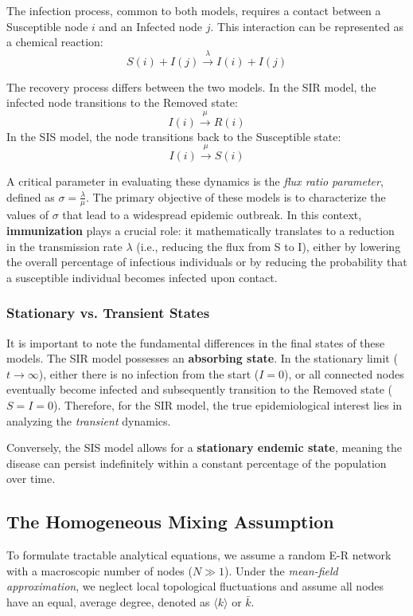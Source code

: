 The infection process, common to both models, requires a contact between a Susceptible node \(i\) and an Infected node \(j\). This interaction can be represented as a chemical reaction:
\[
    S(i) + I(j) \xrightarrow{\lambda} I(i) + I(j)
\]

The recovery process differs between the two models. In the SIR model, the infected node transitions to the Removed state:
\[
    I(i) \xrightarrow{\mu} R(i)
\]
In the SIS model, the node transitions back to the Susceptible state:
\[
    I(i) \xrightarrow{\mu} S(i)
\]

A critical parameter in evaluating these dynamics is the \textit{flux ratio parameter}, defined as \(\sigma = \frac{\lambda}{\mu}\). The primary objective of these models is to characterize the values of \(\sigma\) that lead to a widespread epidemic outbreak. In this context, \textbf{immunization} plays a crucial role: it mathematically translates to a reduction in the transmission rate \(\lambda\) (i.e., reducing the flux from S to I), either by lowering the overall percentage of infectious individuals or by reducing the probability that a susceptible individual becomes infected upon contact.

\subsubsection{Stationary vs. Transient States}

It is important to note the fundamental differences in the final states of these models. The SIR model possesses an \textbf{absorbing state}. In the stationary limit (\(t \to \infty\)), either there is no infection from the start (\(I = 0\)), or all connected nodes eventually become infected and subsequently transition to the Removed state (\(S = I = 0\)). Therefore, for the SIR model, the true epidemiological interest lies in analyzing the \textit{transient} dynamics.

Conversely, the SIS model allows for a \textbf{stationary endemic state}, meaning the disease can persist indefinitely within a constant percentage of the population over time.

\subsection{The Homogeneous Mixing Assumption}
\label{subsec:homogeneous_mixing}

To formulate tractable analytical equations, we assume a random E-R network with a macroscopic number of nodes (\(N \gg 1\)). Under the \textit{mean-field approximation}, we neglect local topological fluctuations and assume all nodes have an equal, average degree, denoted as \(\langle k \rangle\) or \(\bar{k}\).

